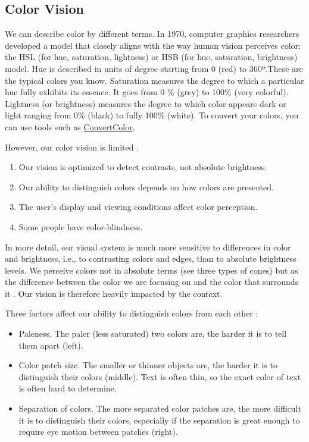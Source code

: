 \documentclass[
]{book}
\providecommand{\tightlist}{%
  \setlength{\itemsep}{0pt}\setlength{\parskip}{0pt}}
\begin{document}
\hypertarget{color-vision}{%
\subsection{Color Vision}\label{color-vision}}

We can describe color by different terms. In 1970, computer graphics researchers developed a model that closely aligns with the way human vision perceives color: the HSL (for hue, saturation, lightness) or HSB (for hue, saturation, brightness) model. Hue is described in units of degree starting from 0 (red) to 360º.These are the typical colors you know. Saturation measures the degree to which a particular hue fully exhibits its essence. It goes from 0 \% (grey) to 100\% (very colorful). Lightness (or brightness) measures the degree to which color appears dark or light ranging from 0\% (black) to fully 100\% (white). To convert your colors, you can use tools such as \href{https://convertacolor.com/}{ConvertColor}.

However, our color vision is limited \citep{Johnson2014designingwiththemind}.

\begin{enumerate}
\def\labelenumi{\arabic{enumi}.}
\tightlist
\item
  Our vision is optimized to detect contrasts, not absolute brightness.
\item
  Our ability to distinguish colors depends on how colors are presented.
\item
  The user's display and viewing conditions affect color perception.
\item
  Some people have color-blindness.
\end{enumerate}

In more detail, our visual system is much more sensitive to differences in color and brightness, i.e., to contrasting colors and edges, than to absolute brightness levels. We perceive colors not in absolute terms (see three types of cones) but as the difference between the color we are focusing on and the color that surrounds it \citep{Few2009nowtoseeit}. Our vision is therefore heavily impacted by the context.

Three factors affect our ability to distinguish colors from each other \citep{Johnson2014designingwiththemind}:

\begin{itemize}
\tightlist
\item
  Paleness. The paler (less saturated) two colors are, the harder it is to tell them apart (left).
\item
  Color patch size. The smaller or thinner objects are, the harder it is to distinguish their colors (middle). Text is often thin, so the exact color of text is often hard to determine.
\item
  Separation of colors. The more separated color patches are, the more difficult it is to distinguish their colors, especially if the separation is great enough to require eye motion between patches (right).
\end{itemize}
\end{document}
